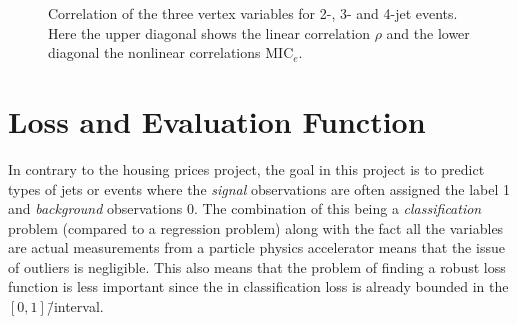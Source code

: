 \begin{figure}%
  \centering
  \caption[Correlation of the Vertex Variables]{Correlation of the three vertex variables for 2-, 3- and 4-jet events. Here the upper diagonal shows the linear correlation $\rho$ and the lower diagonal the nonlinear correlations $\mathrm{MIC}_e$.}%
  \label{fig:q:correlation_vertex_all}%
\end{figure}

\FloatBarrier
\section{Loss and Evaluation Function}
\label{sec:q:loss_evaluation_function}

In contrary to the housing prices project, the goal in this project is to predict types of jets or events where the \emph{signal} observations are often assigned the label \num{1} and \emph{background} observations \num{0}. 
The combination of this being a \emph{classification} problem (compared to a regression problem) along with the fact all the variables are actual measurements from a particle physics accelerator means that the issue of outliers is negligible. This also means that the problem of finding a robust loss function is less important since the in classification loss is already bounded in the $[0, 1]$\=/interval. 

